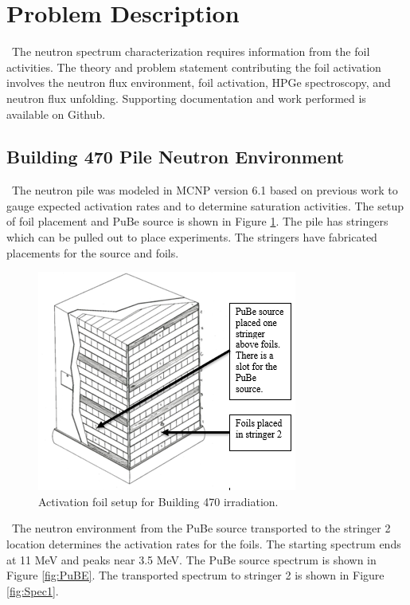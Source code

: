 \documentclass[journal]{IEEEtran}
\let\MYoriglatexcaption\caption
\renewcommand{\caption}[2][\relax]{\MYoriglatexcaption[#2]{#2}}
\begin{document}
	\section{Problem Description}
	
    \ The neutron spectrum characterization requires information from the foil activities. The theory and problem statement contributing the foil activation involves the neutron flux environment, foil activation, HPGe spectroscopy, and neutron flux unfolding. Supporting documentation and work performed is available on Github\cite{Me}. 
	
	\subsection{Building 470 Pile Neutron Environment }
	\ The neutron pile was modeled in MCNP version 6.1 based on previous work to gauge expected activation rates and to determine saturation activities\cite{Will}. The setup of foil placement and PuBe source is shown in Figure \ref{fig:pile}. The pile has stringers which can be pulled out to place experiments. The stringers have fabricated placements for the source and foils. 
	
	\begin{figure}[h!]
		\includegraphics[width=\linewidth]{Figures/PileSetup.png}
		\caption{Activation foil setup for Building 470 irradiation.}
		\label{fig:pile}
	\end{figure}

	\ The neutron environment from the PuBe source transported to the stringer 2 location determines the activation rates for the foils. The starting spectrum ends at 11 MeV and peaks near 3.5 MeV. The PuBe source spectrum is shown in Figure \ref{fig:PuBE}. The transported spectrum to stringer 2 is shown in Figure \ref{fig:Spec1}. 
	
\end{document}
